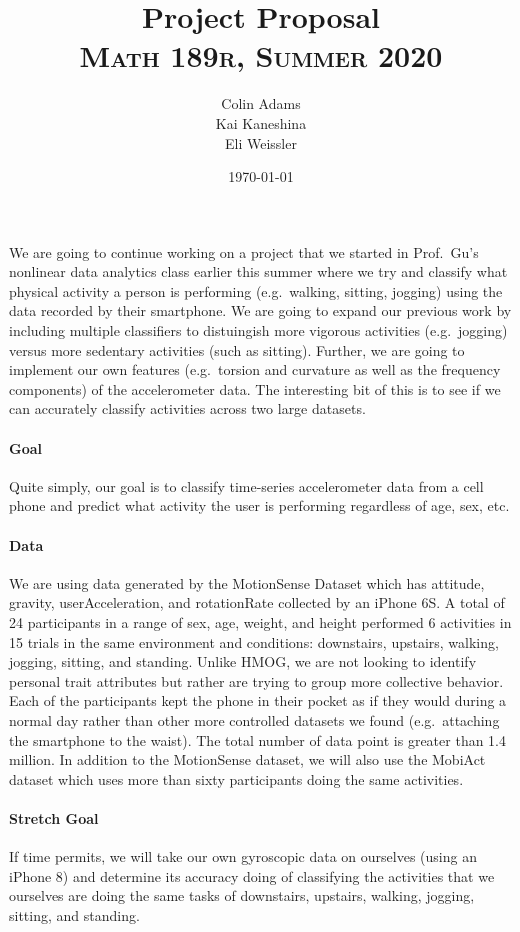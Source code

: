 \documentclass[letterpaper]{article}
\author{Colin Adams\\
      Kai Kaneshina\\
      Eli Weissler  
        }
\title{\huge\textbf{Project Proposal}\\
\Large\textsc{Math 189r, Summer 2020}}
\date{\today}
\begin{document}
    \maketitle
    We are going to continue working on a project that we started in Prof.\ Gu's nonlinear data analytics class earlier this summer where we try and classify what physical activity a person is performing (e.g.\ walking, sitting, jogging) using the data recorded by their smartphone. We are going to expand our previous work by including multiple classifiers to distuingish more vigorous activities (e.g.\ jogging) versus more sedentary activities (such as sitting). Further, we are going to implement our own features (e.g.\ torsion and curvature as well as the frequency components) of the accelerometer data.  The interesting bit of this is to see if we can accurately classify activities across two large datasets. 

    \paragraph{Goal} Quite simply, our goal is to classify time-series accelerometer data from a cell phone and predict what activity the user is performing regardless of age, sex, etc. 

    \paragraph{Data} We are using data generated by the MotionSense Dataset which has attitude, gravity, userAcceleration, and rotationRate collected by an iPhone 6S. A total of 24 participants in a range of sex, age, weight, and height performed 6 activities in 15 trials in the same environment and conditions: downstairs, upstairs, walking, jogging, sitting, and standing. Unlike HMOG, we are not looking to identify personal trait attributes but rather are trying to group more collective behavior. Each of the participants kept the phone in their pocket as if they would during a normal day rather than other more controlled datasets we found (e.g.\ attaching the smartphone to the waist). The total number of data point is greater than 1.4 million. In addition to the MotionSense dataset, we will also use the MobiAct dataset which uses more than sixty participants doing the same activities.

    \paragraph{Stretch Goal} If time permits, we will take our own gyroscopic data on ourselves (using an iPhone 8) and determine its accuracy doing of classifying the activities that we ourselves are doing the same tasks of downstairs, upstairs, walking, jogging, sitting, and standing.
\end{document}
